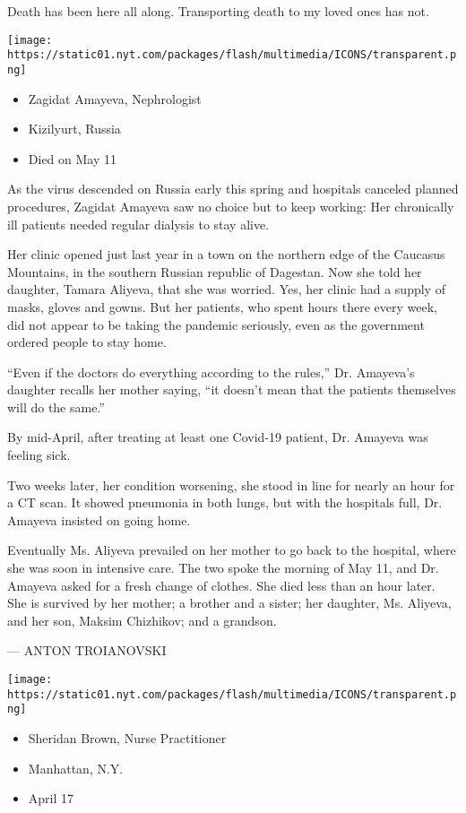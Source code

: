 Death has been here all along. Transporting death to my loved ones has
not.

\texttt{[image: https://static01.nyt.com/packages/flash/multimedia/ICONS/transparent.png]}

\begin{itemize}
\tightlist
\item
  Zagidat Amayeva, Nephrologist
\item
  Kizilyurt, Russia
\item
  Died on May 11
\end{itemize}

As the virus descended on Russia early this spring and hospitals
canceled planned procedures, Zagidat Amayeva saw no choice but to keep
working: Her chronically ill patients needed regular dialysis to stay
alive.

Her clinic opened just last year in a town on the northern edge of the
Caucasus Mountains, in the southern Russian republic of Dagestan. Now
she told her daughter, Tamara Aliyeva, that she was worried. Yes, her
clinic had a supply of masks, gloves and gowns. But her patients, who
spent hours there every week, did not appear to be taking the pandemic
seriously, even as the government ordered people to stay home.

``Even if the doctors do everything according to the rules,'' Dr.
Amayeva's daughter recalls her mother saying, ``it doesn't mean that the
patients themselves will do the same.''

By mid-April, after treating at least one Covid-19 patient, Dr. Amayeva
was feeling sick.

Two weeks later, her condition worsening, she stood in line for nearly
an hour for a CT scan. It showed pneumonia in both lungs, but with the
hospitals full, Dr. Amayeva insisted on going home.

Eventually Ms. Aliyeva prevailed on her mother to go back to the
hospital, where she was soon in intensive care. The two spoke the
morning of May 11, and Dr. Amayeva asked for a fresh change of clothes.
She died less than an hour later. She is survived by her mother; a
brother and a sister; her daughter, Ms. Aliyeva, and her son, Maksim
Chizhikov; and a grandson.

--- ANTON TROIANOVSKI

\texttt{[image: https://static01.nyt.com/packages/flash/multimedia/ICONS/transparent.png]}

\begin{itemize}
\tightlist
\item
  Sheridan Brown, Nurse Practitioner
\item
  Manhattan, N.Y.
\item
  April 17
\end{itemize}

